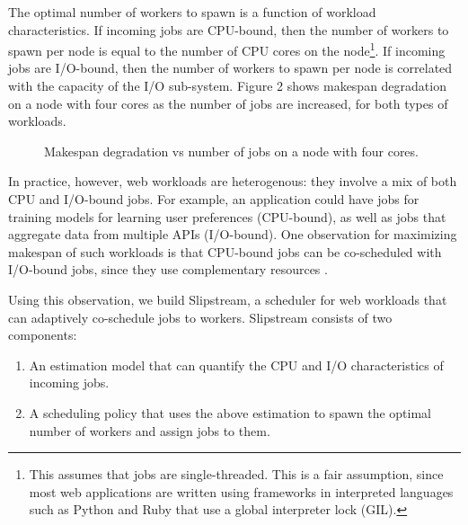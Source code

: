 \documentclass{proc}
\begin{document}
The optimal number of workers to spawn is a function of workload
characteristics. If incoming jobs are CPU-bound, then the number of workers to
spawn per node is equal to the number of CPU cores on the node\footnote{This
assumes that jobs are single-threaded. This is a fair assumption, since most web
applications are written using frameworks in interpreted languages such as
Python and Ruby that use a global interpreter lock (GIL).}. If incoming jobs are
I/O-bound, then the number of workers to spawn per node is correlated with the
capacity of the I/O sub-system. Figure 2 shows makespan degradation on a node
with four cores as the number of jobs are increased, for both types of
workloads.

\begin{figure}
  \centering
  \qquad
  \caption{Makespan degradation vs number of jobs on a node with four cores.}%
  \label{fig:example}%
\end{figure}

In practice, however, web workloads are heterogenous: they involve a mix of both
CPU and I/O-bound jobs. For example, an application could have jobs for training
models for learning user preferences (CPU-bound), as well as jobs that aggregate
data from multiple APIs (I/O-bound). One observation for maximizing makespan
of such workloads is that CPU-bound jobs can be co-scheduled with I/O-bound
jobs, since they use complementary resources \cite{10.1109/TPDS.2003.1206505}.

Using this observation, we build Slipstream, a scheduler for web workloads that
can adaptively co-schedule jobs to workers. Slipstream consists of two
components:
\begin{enumerate}
  \item An estimation model that can quantify the CPU and I/O characteristics of
  incoming jobs.
  \item A scheduling policy that uses the above estimation to spawn the optimal
  number of workers and assign jobs to them.
\end{enumerate}
\end{document}
